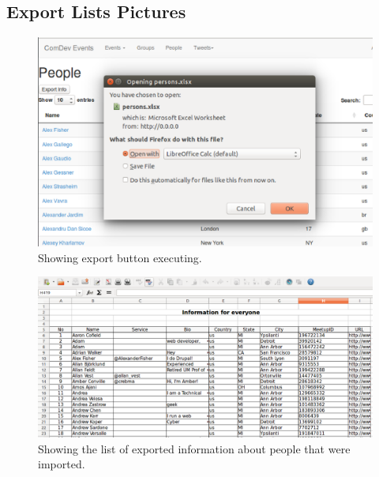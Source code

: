 \documentclass[draftclsnofoot,10pt,onecolumn]{IEEEtran} %
\begin{document}
\subsection{Export Lists Pictures}

\begin{figure}[H]
  \begin{center}
  \includegraphics[width=5in, frame]{exporting1}
  \captionsetup{width=.4\linewidth}
  \centering
  \caption{Showing export button executing. }

  \end{center}
\end{figure}

\begin{figure}[H]
  \begin{center}
  
  \includegraphics[width=6in, frame]{exporting2}
  \captionsetup{width=.4\linewidth}
  \centering
  \caption{Showing the list of exported information about people that were imported. }

  \end{center}
\end{figure}
\end{document}
